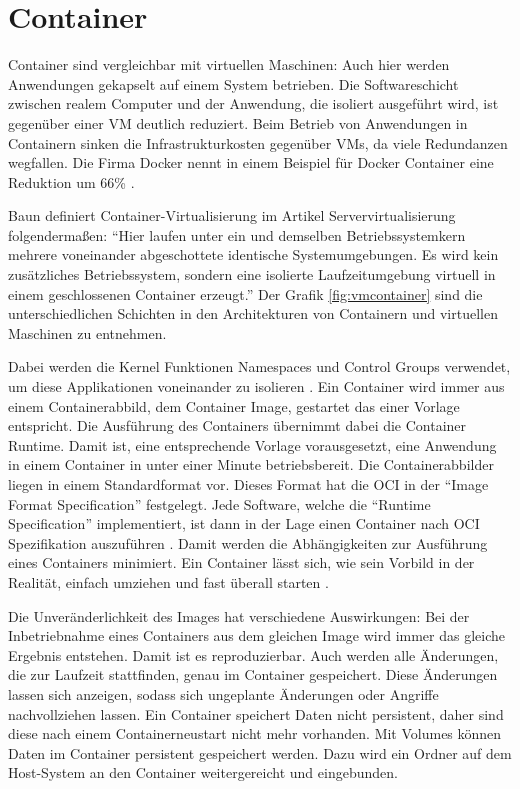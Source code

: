 \section{Container}
\label{sec:container}
Container sind vergleichbar mit virtuellen Maschinen: Auch hier werden Anwendungen gekapselt auf einem System betrieben. Die Softwareschicht zwischen realem Computer und der Anwendung, die isoliert ausgeführt wird, ist gegenüber einer \ac{VM} deutlich reduziert. Beim Betrieb von Anwendungen in Containern sinken die Infrastrukturkosten gegenüber \acp{VM}, da viele Redundanzen wegfallen. Die Firma Docker nennt in einem Beispiel für Docker Container eine Reduktion um 66\% \cite[vgl.][]{BettyJunod.2017}.

Baun definiert Container-Virtualisierung im Artikel Servervirtualisierung folgendermaßen: "`Hier laufen unter ein und demselben Betriebssystemkern mehrere voneinander abgeschottete identische Systemumgebungen. Es wird kein zusätzliches Betriebssystem, sondern eine isolierte Laufzeitumgebung virtuell in einem geschlossenen Container erzeugt."' \cite[203]{Baun.2009}
Der Grafik \ref{fig:vmcontainer} sind die unterschiedlichen Schichten in den Architekturen von Containern und virtuellen Maschinen zu entnehmen.

Dabei werden die Kernel Funktionen Namespaces und Control Groups verwendet, um diese Applikationen voneinander zu isolieren \cite[vgl.][4]{Scholl.2019}.
Ein Container wird immer aus einem Containerabbild, dem Container Image, gestartet das einer Vorlage entspricht. Die Ausführung des Containers übernimmt dabei die Container Runtime. Damit ist, eine entsprechende Vorlage vorausgesetzt, eine Anwendung in einem Container in unter einer Minute betriebsbereit. Die Containerabbilder liegen in einem Standardformat vor. \cite[vgl.][S. 240 f.]{Baun.2017}
Dieses Format hat die \ac{OCI} in der "`Image Format Specification"' \cite[vgl.][]{OpenContainerInitiative.} festgelegt. Jede Software, welche die "`Runtime Specification"'  \cite[vgl.][]{OpenContainerInitiative.20200205} implementiert, ist dann in der Lage einen Container nach \ac{OCI} Spezifikation auszuführen \cite[vgl.][]{FerdinandThommes.20170720}.
Damit werden die Abhängigkeiten zur Ausführung eines Containers minimiert. Ein Container lässt sich, wie sein Vorbild in der Realität, einfach umziehen und fast überall starten \cite[vgl.][15]{Jangla.2018}. 

Die Unveränderlichkeit des Images hat verschiedene Auswirkungen: Bei der Inbetriebnahme eines Containers aus dem gleichen Image wird immer das gleiche Ergebnis entstehen. Damit ist es reproduzierbar. Auch werden alle Änderungen, die zur Laufzeit stattfinden, genau im Container gespeichert. Diese Änderungen lassen sich anzeigen, sodass sich ungeplante Änderungen oder Angriffe nachvollziehen lassen.
Ein Container speichert Daten nicht persistent, daher sind diese nach einem Containerneustart nicht mehr vorhanden. Mit Volumes können Daten im Container persistent gespeichert werden. Dazu wird ein Ordner auf dem Host-System an den Container weitergereicht und eingebunden.  \cite[vgl.][4]{Felter.2015}

